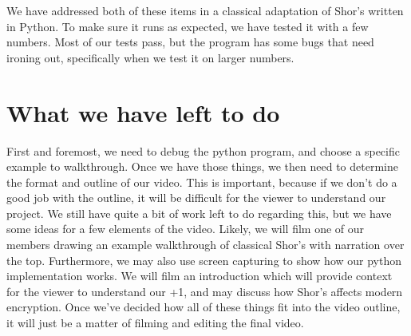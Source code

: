 \documentclass[a4paper]{article}
\begin{document}
We have addressed both of these items in a classical adaptation of Shor's 
written in Python. To make sure it runs as expected, we have tested it 
with a few numbers. Most of our tests pass, but the program has
some bugs that need ironing out, specifically when we test it on larger numbers.


\section{What we have left to do}
First and foremost, we need to debug the python program, and choose a specific example to walkthrough.
Once we have those things, we then need to determine the format and outline of our video. This is important, 
because if we don't do a good job with the outline, it will be difficult for the viewer to understand our project. We still 
have quite a bit of work left to do regarding this, but we have some ideas for a few elements of the video. Likely, we will film one of 
our members drawing an example walkthrough of classical Shor's with narration over the top. Furthermore, we may also 
use screen capturing to show how our python implementation works. We will film an introduction which will provide context for the viewer to understand our +1, 
and may discuss how Shor's affects modern encryption. Once we've decided how all of these things fit into the video outline, it will just be a 
matter of filming and editing the final video.

\newpage


\end{document}
